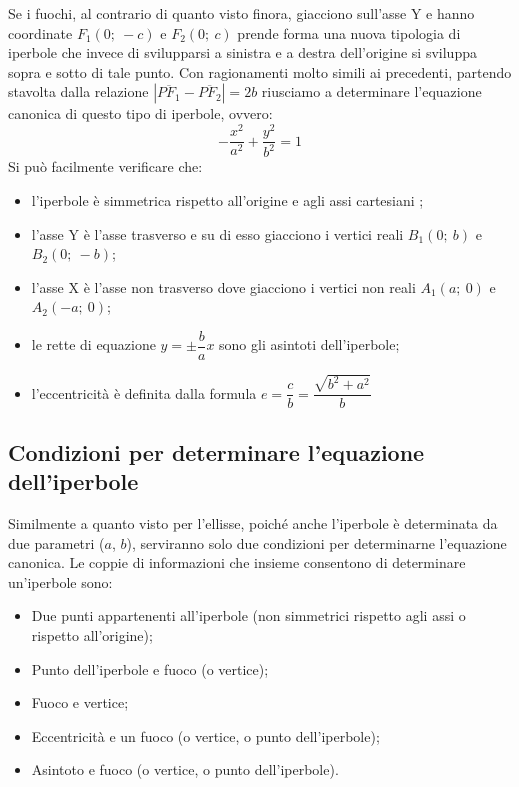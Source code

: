 Se i fuochi, al contrario di quanto visto finora, giacciono sull'asse Y e 
hanno coordinate \( F_{1} (0;~-c)\) e \( F_{2} (0;~c)\) prende forma una nuova 
tipologia di iperbole che invece di svilupparsi a sinistra e a destra 
dell'origine si sviluppa sopra e sotto di tale punto.
Con ragionamenti molto simili ai precedenti, partendo stavolta dalla relazione 
\(\left|\overline{PF_{1}}-\overline{PF_{2}}\right|=2b\) riusciamo a 
determinare l'equazione canonica di questo tipo di iperbole, ovvero: 
\begin{equation}
-\dfrac{x^{2}}{a^{2}}+\dfrac{y^{2}}{b^{2}}=1
\end{equation}
Si può facilmente verificare che:
\begin{itemize} [noitemsep]
  \item l'iperbole è simmetrica rispetto all'origine e agli assi 
cartesiani ;
  \item l'asse Y è l'asse trasverso e su di esso giacciono i vertici 
reali \( B_{1} (0;~b)\) e \( B_{2} (0;~-b)\);
  \item l'asse X è l'asse non trasverso dove giacciono i vertici non 
reali \( A_{1} (a;~0)\) e \( A_{2} (-a;~0)\);
  \item le rette di equazione \(y= \pm \dfrac{b}{a}  x\) sono gli asintoti dell'iperbole;
  \item l'eccentricità è definita dalla formula 
\(e=\dfrac{c}{b}=\dfrac{\sqrt{b^{2}+a^{2}}}{b} \)
\end{itemize}

\subsection{Condizioni per determinare l'equazione dell'iperbole}

Similmente a quanto visto per l'ellisse, poiché anche l'iperbole 
è determinata da due parametri (\(a\), \(b\)), serviranno solo due condizioni per 
determinarne l'equazione canonica.
Le coppie di informazioni che insieme consentono di determinare un'iperbole 
sono:
\begin{itemize}[noitemsep]
\item Due punti appartenenti all'iperbole (non simmetrici rispetto 
agli assi o rispetto all'origine);
\item Punto dell'iperbole e fuoco (o vertice);
\item Fuoco e vertice;
\item Eccentricità e un fuoco (o vertice, o punto dell'iperbole);
\item Asintoto e fuoco (o vertice, o punto dell'iperbole).
\end{itemize}

